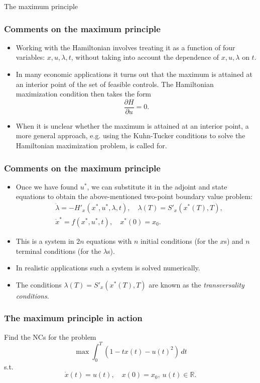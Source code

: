 \documentclass[10pt]{beamer}
\theoremstyle{definition}
\begin{document}
\begin{section}{The maximum principle}
\begin{frame}[fragile]
\frametitle{Comments on the maximum principle}
\begin{itemize}\itemsep1em
\item Working with the Hamiltonian involves treating it as a function of four variables: $ x,u,\lambda,t $, without taking into account the dependence of $ x,u,\lambda $ on $ t $.
\item In many economic applications it turns out that the maximum is attained at an interior point of the set of feasible controls. The Hamiltonian maximization condition then takes the form \[ \dfrac{\partial H}{\partial u} = 0. \]
\item When it is unclear whether the maximum is attained at an interior point, a more general approach, e.g. using the Kuhn-Tucker conditions to solve the Hamiltonian maximization problem, is called for.
\end{itemize}
\end{frame}

\begin{frame}[fragile]
\frametitle{Comments on the maximum principle}
\begin{itemize}\itemsep1em
\item Once we have found $ u^* $, we can substitute it in the adjoint and state equations to obtain the above-mentioned two-point boundary value problem:
\[ \begin{split}
&\dot{\lambda}  = -H'_x(x^*,u^*,\lambda,t),\quad  \lambda(T)=S'_x(x^*(T),T),\\
&\dot{x}^*  = f(x^*,u^*,t), \quad x^*(0)=x_0.
\end{split} \]
\item This is a system in $ 2n $ equations with $ n $ initial conditions (for the $ x $s)  and $ n $ terminal conditions (for the $ \lambda $s).
\item In realistic applications such a system is solved numerically.
\item The conditions $ \lambda(T)=S'_x(x^*(T),T) $ are known as the \emph{transversality conditions}.
\end{itemize}
\end{frame}

\begin{frame}[fragile]
\frametitle{The maximum principle in action}
\begin{example}
Find the NCs for the problem
\[ \max \int_{0}^{T}(1-tx(t)-u(t)^2)\,dt \]
s.t. \[ \dot{x}(t)=u(t),\quad x(0)=x_0,~u(t)\in \mathbb{R}. \]\bigskip \pause


\end{example}
\end{frame}
\end{section}
\end{document}
